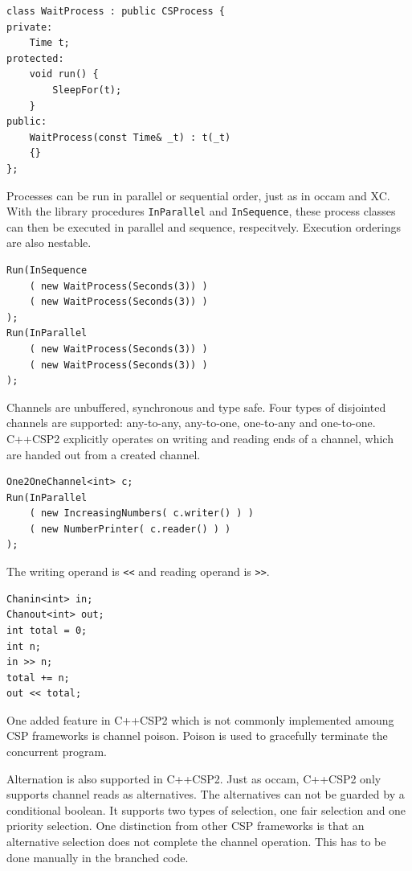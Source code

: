 \begin{lstlisting}[style={CustomC++},frame={},numbers={none},xleftmargin={4em}]
class WaitProcess : public CSProcess {
private:
    Time t;
protected:
    void run() {
        SleepFor(t);
    }
public:
    WaitProcess(const Time& _t) : t(_t)
    {}
};
\end{lstlisting}

Processes can be run in parallel or sequential order, just as in occam and XC. With the library procedures \texttt{InParallel} and \texttt{InSequence}, these process classes can then be executed in parallel and sequence, respecitvely. Execution orderings are also nestable.

\begin{lstlisting}[style={CustomC++},frame={},numbers={none},xleftmargin={4em}]
Run(InSequence
    ( new WaitProcess(Seconds(3)) )
    ( new WaitProcess(Seconds(3)) )
);
Run(InParallel
    ( new WaitProcess(Seconds(3)) )
    ( new WaitProcess(Seconds(3)) )
);
\end{lstlisting}

Channels are unbuffered, synchronous and type safe. Four types of disjointed channels are supported: any\hyp{}to\hyp{}any, any\hyp{}to\hyp{}one, one\hyp{}to\hyp{}any and one\hyp{}to\hyp{}one. C++CSP2 explicitly operates on writing and reading ends of a channel, which are handed out from a created channel. 

\begin{lstlisting}[style={CustomC++},frame={},numbers={none},xleftmargin={4em}]
One2OneChannel<int> c;
Run(InParallel
    ( new IncreasingNumbers( c.writer() ) )
    ( new NumberPrinter( c.reader() ) )
);
\end{lstlisting}

The writing operand is \texttt{<{}<} and reading operand is \texttt{>{}>}. 

\begin{lstlisting}[style={CustomC++},frame={},numbers={none},xleftmargin={4em}]
Chanin<int> in;
Chanout<int> out;
int total = 0;          
int n;
in >> n;
total += n;
out << total;
\end{lstlisting}

One added feature in C++CSP2 which is not commonly implemented amoung CSP frameworks is channel poison. Poison is used to gracefully terminate the concurrent program. 

Alternation is also supported in C++CSP2. Just as occam, C++CSP2 only supports channel reads as alternatives. The alternatives can not be guarded by a conditional boolean. It supports two types of selection, one fair selection and one priority selection. One distinction from other CSP frameworks is that an alternative selection does not complete the channel operation. This has to be done manually in the branched code. 

